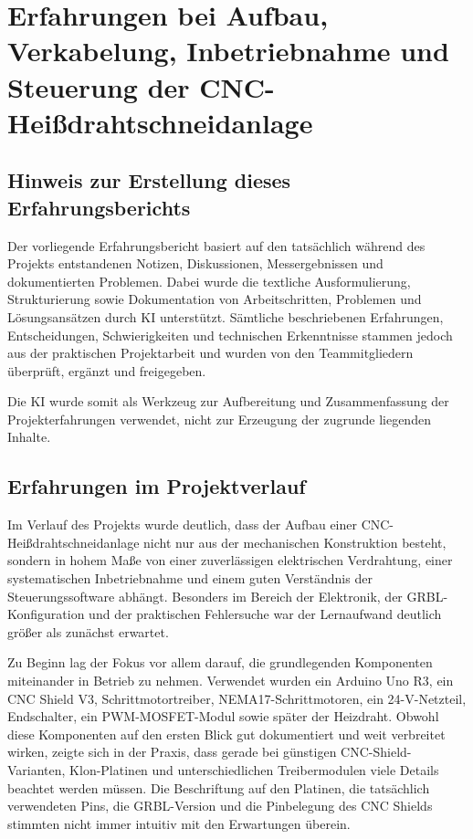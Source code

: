 
\chapter{Erfahrungen bei Aufbau, Verkabelung, Inbetriebnahme und Steuerung der CNC-Heißdrahtschneidanlage}

\section{Hinweis zur Erstellung dieses Erfahrungsberichts}

Der vorliegende Erfahrungsbericht basiert auf den tatsächlich während des Projekts entstandenen Notizen, Diskussionen, Messergebnissen und dokumentierten Problemen. Dabei wurde die textliche Ausformulierung, Strukturierung sowie Dokumentation von Arbeitschritten, Problemen und Lösungsansätzen durch KI unterstützt. Sämtliche beschriebenen Erfahrungen, Entscheidungen, Schwierigkeiten und technischen Erkenntnisse stammen jedoch aus der praktischen Projektarbeit und wurden von den Teammitgliedern überprüft, ergänzt und freigegeben.

Die KI wurde somit als Werkzeug zur Aufbereitung und Zusammenfassung der Projekterfahrungen verwendet, nicht zur Erzeugung der zugrunde liegenden Inhalte.

\section{Erfahrungen im Projektverlauf}

Im Verlauf des Projekts wurde deutlich, dass der Aufbau einer CNC-Heißdrahtschneidanlage nicht nur aus der mechanischen Konstruktion besteht, sondern in hohem Maße von einer zuverlässigen elektrischen Verdrahtung, einer systematischen Inbetriebnahme und einem guten Verständnis der Steuerungssoftware abhängt. Besonders im Bereich der Elektronik, der GRBL-Konfiguration und der praktischen Fehlersuche war der Lernaufwand deutlich größer als zunächst erwartet.

Zu Beginn lag der Fokus vor allem darauf, die grundlegenden Komponenten miteinander in Betrieb zu nehmen. Verwendet wurden ein Arduino Uno R3, ein CNC Shield V3, Schrittmotortreiber, NEMA17-Schrittmotoren, ein 24-V-Netzteil, Endschalter, ein PWM-MOSFET-Modul sowie später der Heizdraht. Obwohl diese Komponenten auf den ersten Blick gut dokumentiert und weit verbreitet wirken, zeigte sich in der Praxis, dass gerade bei günstigen CNC-Shield-Varianten, Klon-Platinen und unterschiedlichen Treibermodulen viele Details beachtet werden müssen. Die Beschriftung auf den Platinen, die tatsächlich verwendeten Pins, die GRBL-Version und die Pinbelegung des CNC Shields stimmten nicht immer intuitiv mit den Erwartungen überein.

